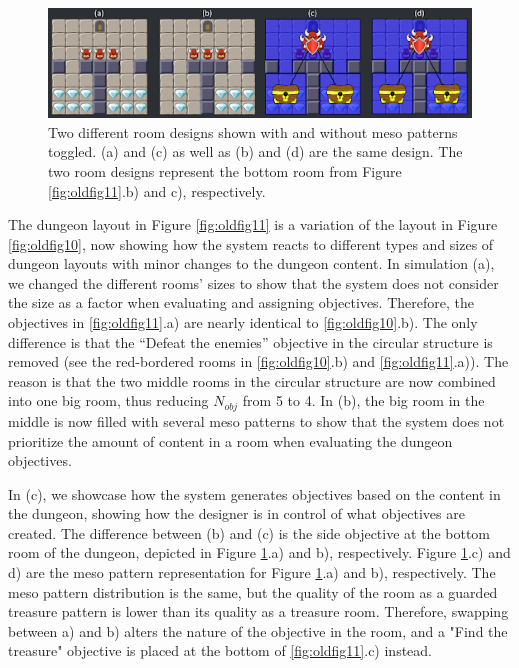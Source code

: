 \begin{figure}[h]
  \centering
  \includegraphics[width=\columnwidth]{included-papers-tex/paper-7/figures/results8.png}
  \caption{Two different room designs shown with and without meso patterns toggled. (a) and (c) as well as (b) and (d) are the same design. The two room designs represent the bottom room from Figure \ref{fig:oldfig11}.b) and c), respectively.}
  \label{fig:oldfig12}
\end{figure}

The dungeon layout in Figure \ref{fig:oldfig11} is a variation of the layout in Figure \ref{fig:oldfig10}, now showing how the system reacts to different types and sizes of dungeon layouts with minor changes to the dungeon content. In simulation (a), we changed the different rooms' sizes to show that the system does not consider the size as a factor when evaluating and assigning objectives. Therefore, the objectives in \ref{fig:oldfig11}.a) are nearly identical to \ref{fig:oldfig10}.b). The only difference is that the “Defeat the enemies” objective in the circular structure is removed (see the red-bordered rooms in \ref{fig:oldfig10}.b) and \ref{fig:oldfig11}.a)). The reason is that the two middle rooms in the circular structure are now combined into one big room, thus reducing $N_{obj}$ from 5 to 4. In (b), the big room in the middle is now filled with several meso patterns to show that the system does not prioritize the amount of content in a room when evaluating the dungeon objectives. 

In (c), we showcase how the system generates objectives based on the content in the dungeon, showing how the designer is in control of what objectives are created. The difference between (b) and (c) is the side objective at the bottom room of the dungeon, depicted in Figure \ref{fig:oldfig12}.a) and b), respectively. Figure \ref{fig:oldfig12}.c) and d) are the meso pattern representation for Figure \ref{fig:oldfig12}.a) and b), respectively. The meso pattern distribution is the same, but the quality of the room as a guarded treasure pattern is lower than its quality as a treasure room. Therefore, swapping between a) and b) alters the nature of the objective in the room, and a "Find the treasure" objective is placed at the bottom of \ref{fig:oldfig11}.c) instead. 

